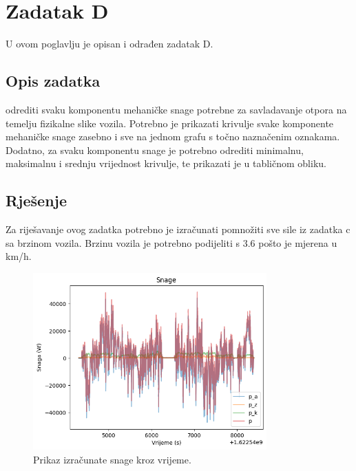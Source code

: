 \chapter{Zadatak D} \label{ch:d}

U ovom poglavlju je opisan i odrađen zadatak D.

\section{Opis zadatka} \label{sec:d:opis}
odrediti svaku komponentu mehaničke snage potrebne za savladavanje otpora na temelju fizikalne
slike vozila. Potrebno je prikazati krivulje svake komponente mehaničke snage zasebno i sve na
jednom grafu s točno naznačenim oznakama. Dodatno, za svaku komponentu snage je potrebno
odrediti minimalnu, maksimalnu i srednju vrijednost krivulje, te prikazati je u tabličnom obliku.

\section{Rješenje} \label{sec:d:rjesenje}

Za riješavanje ovog zadatka potrebno je izračunati pomnožiti sve sile iz zadatka c sa brzinom vozila.
Brzinu vozila je potrebno podijeliti s 3.6 pošto je mjerena u km/h.


\begin{figure}
    \centering
    \includegraphics[width=0.8\textwidth]{images/powers.png}
    \caption{Prikaz izračunate snage kroz vrijeme.}
    \label{fig:d:power_graph}
\end{figure}


